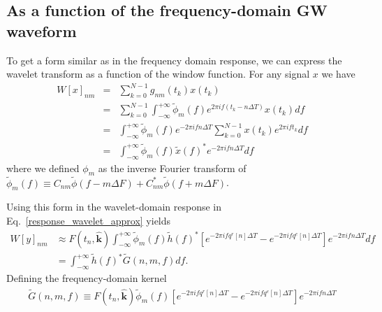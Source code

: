 \documentclass{article}
\begin{document}
\subsection{As a function of the frequency-domain GW waveform}

To get a form similar as in the frequency domain response, we can express the wavelet transform as a function of the window function.
For any signal $x$ we have
\begin{eqnarray}
    W[x]_{nm} &=& \sum_{k=0}^{N-1} g_{nm}(t_k) x(t_k) \nonumber \\
              &=& \sum_{k=0}^{N-1} \int_{-\infty}^{+\infty} \tilde{\phi}_{m}(f) e^{2 \pi i f (t_k-n \Delta T)} x(t_k) df \nonumber \\
              & = & \int_{-\infty}^{+\infty} \tilde{\phi}_{m}(f) e^{-2 \pi i f n \Delta T} \sum_{k=0}^{N-1} x(t_k) e^{2 \pi i f t_k} df \nonumber \\
              & = & \int_{-\infty}^{+\infty} \tilde{\phi}_{m}(f)  \tilde{x}(f)^{\ast} e^{-2 \pi i f n \Delta T}df
\end{eqnarray}
where we defined $\phi_{m}$ as the inverse Fourier transform of $\tilde{\phi}_{m}(f) \equiv C_{nm}\tilde\phi(f-m\Delta F)+C^*_{nm}\tilde\phi(f+m\Delta F )$.

Using this form in the wavelet-domain response in Eq.~\eqref{response_wavelet_approx} yields
\begin{align}
\label{response_wavelet_approx_freq}
W[y]_{nm} & \approx F(t_n, \hat{\mathbf{k}}) \int_{-\infty}^{+\infty} \tilde{\phi}_{m}(f) \tilde{h}(f)^{\ast}  \left[ e^{-2 \pi i f q^{r}[n] \Delta T} - e^{-2 \pi i f q^{e}[n] \Delta T}\right] e^{-2 \pi i f n \Delta T} df \nonumber \\
& = \int_{-\infty}^{+\infty} \tilde{h}(f)^{\ast} \tilde{G}(n, m, f) df.
\end{align}
Defining the frequency-domain kernel
\begin{eqnarray}
    \tilde{G}(n, m, f) \equiv  F(t_n, \hat{\mathbf{k}}) \tilde{\phi}_{m}(f)  \left[ e^{-2 \pi i f q^{r}[n] \Delta T} - e^{-2 \pi i f q^{e}[n] \Delta T}\right] e^{-2 \pi i f n \Delta T}
\end{eqnarray}
\end{document}
